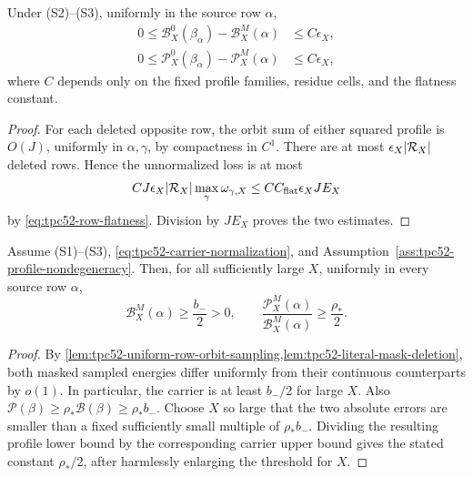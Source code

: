 \begin{lemma}
\label{lem:tpc52-literal-mask-deletion}
Under \textup{(S2)}--\textup{(S3)}, uniformly in the source row \(\alpha\),
\begin{align}
 0\le
 \mathscr B_X^0(\beta_\alpha)-\mathscr B_X^M(\alpha)
 &\le C\epsilon_X,
 \label{eq:tpc52-carrier-mask-deletion}\\
 0\le
 \mathscr P_X^0(\beta_\alpha)-\mathscr P_X^M(\alpha)
 &\le C\epsilon_X,
 \label{eq:tpc52-profile-mask-deletion}
\end{align}
where \(C\) depends only on the fixed profile families, residue cells, and
the flatness constant.
\end{lemma}

\begin{proof}
For each deleted opposite row, the orbit sum of either squared profile is
\(O(J)\), uniformly in \(\alpha,\gamma\), by compactness in \(C^1\).
There are at most \(\epsilon_X|\mathcal R_X|\) deleted rows.  Hence the unnormalized
loss is at most
\[
 C J\epsilon_X|\mathcal R_X|
       \max_\gamma\omega_{\gamma,X}
 \le C C_{\rm flat}\epsilon_XJE_X
\]
by \eqref{eq:tpc52-row-flatness}.  Division by \(JE_X\) proves the two
estimates.
\end{proof}

\begin{theorem}
\label{thm:tpc52-uniform-sampled-overlap}
Assume \textup{(S1)}--\textup{(S3)},
\eqref{eq:tpc52-carrier-normalization}, and
Assumption~\ref{ass:tpc52-profile-nondegeneracy}.  Then, for all sufficiently
large \(X\), uniformly in every source row \(\alpha\),
\begin{equation}
 \mathscr B_X^M(\alpha)\ge \frac{b_-}{2}>0,
 \qquad
 \frac{\mathscr P_X^M(\alpha)}{\mathscr B_X^M(\alpha)}
 \ge \frac{\rho_*}{2}.
 \label{eq:tpc52-uniform-masked-overlap}
\end{equation}
\end{theorem}

\begin{proof}
By \cref{lem:tpc52-uniform-row-orbit-sampling,lem:tpc52-literal-mask-deletion},
both masked sampled energies differ
uniformly from their continuous counterparts by \(o(1)\).  In particular,
the carrier is at least \(b_-/2\) for large \(X\).  Also
\(\mathscr P(\beta)\ge\rho_*\mathscr B(\beta)\ge\rho_*b_-\).  Choose \(X\)
so large that the two absolute errors are smaller than a fixed sufficiently
small multiple of \(\rho_*b_-\).  Dividing the resulting profile lower bound
by the corresponding carrier upper bound gives the stated constant
\(\rho_*/2\), after harmlessly enlarging the threshold for \(X\).
\end{proof}

